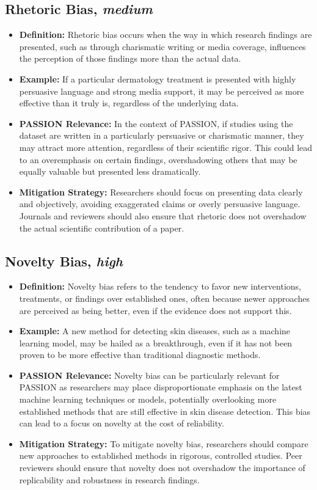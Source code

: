 \begin{refsection}
	\subsection{Rhetoric Bias, \textit{medium}}
	\begin{itemize}
		\item \textbf{Definition:} Rhetoric bias occurs when the way in which research findings are presented, such as through charismatic writing or media coverage, influences the perception of those findings more than the actual data.
		\item \textbf{Example:} If a particular dermatology treatment is presented with highly persuasive language and strong media support, it may be perceived as more effective than it truly is, regardless of the underlying data.
		\item \textbf{PASSION Relevance:} In the context of PASSION, if studies using the dataset are written in a particularly persuasive or charismatic manner, they may attract more attention, regardless of their scientific rigor. This could lead to an overemphasis on certain findings, overshadowing others that may be equally valuable but presented less dramatically.
		\item \textbf{Mitigation Strategy:} Researchers should focus on presenting data clearly and objectively, avoiding exaggerated claims or overly persuasive language. Journals and reviewers should also ensure that rhetoric does not overshadow the actual scientific contribution of a paper.
	\end{itemize}
	
	\subsection{Novelty Bias, \textit{high}}
	\begin{itemize}
		\item \textbf{Definition:} Novelty bias refers to the tendency to favor new interventions, treatments, or findings over established ones, often because newer approaches are perceived as being better, even if the evidence does not support this.
		\item \textbf{Example:} A new method for detecting skin diseases, such as a machine learning model, may be hailed as a breakthrough, even if it has not been proven to be more effective than traditional diagnostic methods.
		\item \textbf{PASSION Relevance:} Novelty bias can be particularly relevant for PASSION as researchers may place disproportionate emphasis on the latest machine learning techniques or models, potentially overlooking more established methods that are still effective in skin disease detection. This bias can lead to a focus on novelty at the cost of reliability.
		\item \textbf{Mitigation Strategy:} To mitigate novelty bias, researchers should compare new approaches to established methods in rigorous, controlled studies. Peer reviewers should ensure that novelty does not overshadow the importance of replicability and robustness in research findings.
	\end{itemize}
	

\end{refsection}
